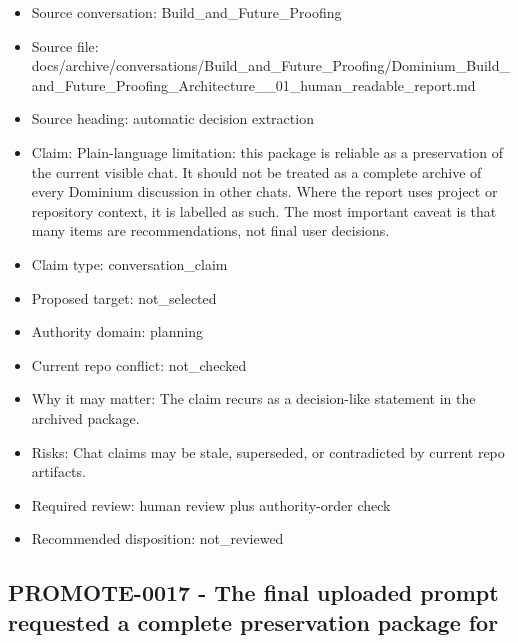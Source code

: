 \documentclass[11pt,a4paper]{report}
\begin{document}
\begin{itemize}
\item Source conversation: Build\_and\_Future\_Proofing
\item Source file: docs/archive/conversations/Build\_and\_Future\_Proofing/Dominium\_Build\_and\_Future\_Proofing\_Architecture\_\_01\_human\_readable\_report.md
\item Source heading: automatic decision extraction
\item Claim: Plain-language limitation: this package is reliable as a preservation of the current visible chat. It should not be treated as a complete archive of every Dominium discussion in other chats. Where the report uses project or repository context, it is labelled as such. The most important caveat is that many items are recommendations, not final user decisions.
\item Claim type: conversation\_claim
\item Proposed target: not\_selected
\item Authority domain: planning
\item Current repo conflict: not\_checked
\item Why it may matter: The claim recurs as a decision-like statement in the archived package.
\item Risks: Chat claims may be stale, superseded, or contradicted by current repo artifacts.
\item Required review: human review plus authority-order check
\item Recommended disposition: not\_reviewed
\end{itemize}

\subsection{PROMOTE-0017 - The final uploaded prompt requested a complete preservation package for}
\end{document}
